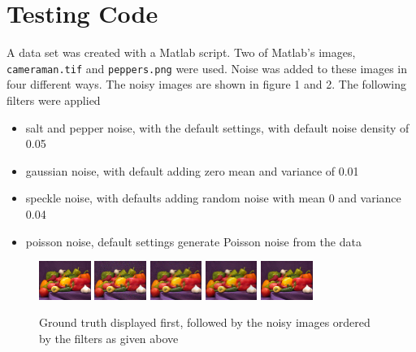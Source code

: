\documentclass{article}
\begin{document}
  \section{Testing Code}
  A data set was created with a Matlab script. Two of Matlab's images,
  \texttt{cameraman.tif} and \texttt{peppers.png} were used. Noise was
  added to these images in four different ways. The noisy images are
  shown in figure 1 and 2. The following filters
  were applied
  \begin{itemize}
    \item salt and pepper noise, with the default settings, with
      default noise density of 0.05
    \item gaussian noise, with default adding zero mean and variance
      of 0.01 
    \item speckle noise, with defaults adding random noise with mean 0
      and variance 0.04 
    \item poisson noise, default settings generate Poisson noise from
      the data
    \end{itemize}

    \begin{figure}[H]
      \centering
      \includegraphics[width =0.15\textwidth]{../images/peps_truth}
      \includegraphics[width =0.15\textwidth]{../images/peps_noisy1}
      \includegraphics[width =0.15\textwidth]{../images/peps_noisy2}
      \includegraphics[width =0.15\textwidth]{../images/peps_noisy3}
      \includegraphics[width =0.15\textwidth]{../images/peps_noisy4}
      \caption{Ground truth displayed first, followed by the noisy
        images ordered by the filters as given above}
    \end{figure}
    
\end{document}
